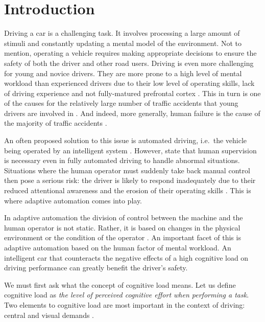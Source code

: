 
\section{Introduction}\label{sec:introduction}

Driving a car is a challenging task. 
It involves processing a large amount of stimuli and constantly updating a mental model of the environment.
Not to mention, operating a vehicle requires making appropriate decisions to ensure the safety of both the driver and other road users.
Driving is even more challenging for young and novice drivers. 
They are more prone to a high level of mental workload than experienced drivers due to their low level of operating skills, lack of driving experience \citep{Gregersen1996} and not fully-matured prefrontal cortex \citep{Ross2014}.
This in turn is one of the causes for the relatively large number of traffic accidents that young drivers are involved in \citep{Sena2013}.
And indeed, more generally, human failure is the cause of the majority of traffic accidents \citep{DeWaard1996}.

An often proposed solution to this issue is automated driving, i.e.\ the vehicle being operated by an intelligent system \citep{Cabrall2018}.
However, \citet{Brookhuis2007} state that human supervision is necessary even in fully automated driving to handle abnormal situations.
Situations where the human operator must suddenly take back manual control then pose a serious risk:
the driver is likely to respond inadequately due to their reduced attentional awareness and the erosion of their operating skills \citep{Dijksterhuis2012}.
This is where adaptive automation comes into play.

In adaptive automation the division of control between the machine and the human operator is not static.
Rather, it is based on changes in the physical environment or the condition of the operator \citep{Sheridan2011}.
An important facet of this is adaptive automation based on the human factor of mental workload.
An intelligent car that counteracts the negative effects of a high cognitive load on driving performance can greatly benefit the driver's safety.

We must first ask what the concept of cognitive load means.
Let us define cognitive load as \textit{the level of perceived cognitive effort when performing a task}.
Two elements to cognitive load are most important in the context of driving: central and visual demands \citep{DeWaard1996}. 

